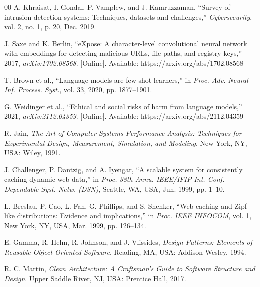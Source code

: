 \documentclass[conference]{IEEEtran}
\begin{document}
\begin{thebibliography}{00}
 A. Khraisat, I. Gondal, P. Vamplew, and J. Kamruzzaman, ``Survey of intrusion detection systems: Techniques, datasets and challenges,'' \textit{Cybersecurity}, vol. 2, no. 1, p. 20, Dec. 2019.

 J. Saxe and K. Berlin, ``eXpose: A character-level convolutional neural network with embeddings for detecting malicious URLs, file paths, and registry keys,'' 2017, \textit{arXiv:1702.08568}. [Online]. Available: https://arxiv.org/abs/1702.08568

 T. Brown et al., ``Language models are few-shot learners,'' in \textit{Proc. Adv. Neural Inf. Process. Syst.}, vol. 33, 2020, pp. 1877--1901.

 G. Weidinger et al., ``Ethical and social risks of harm from language models,'' 2021, \textit{arXiv:2112.04359}. [Online]. Available: https://arxiv.org/abs/2112.04359

 R. Jain, \textit{The Art of Computer Systems Performance Analysis: Techniques for Experimental Design, Measurement, Simulation, and Modeling}. New York, NY, USA: Wiley, 1991.

 J. Challenger, P. Dantzig, and A. Iyengar, ``A scalable system for consistently caching dynamic web data,'' in \textit{Proc. 38th Annu. IEEE/IFIP Int. Conf. Dependable Syst. Netw. (DSN)}, Seattle, WA, USA, Jun. 1999, pp. 1--10.

 L. Breslau, P. Cao, L. Fan, G. Phillips, and S. Shenker, ``Web caching and Zipf-like distributions: Evidence and implications,'' in \textit{Proc. IEEE INFOCOM}, vol. 1, New York, NY, USA, Mar. 1999, pp. 126--134.

 E. Gamma, R. Helm, R. Johnson, and J. Vlissides, \textit{Design Patterns: Elements of Reusable Object-Oriented Software}. Reading, MA, USA: Addison-Wesley, 1994.

 R. C. Martin, \textit{Clean Architecture: A Craftsman's Guide to Software Structure and Design}. Upper Saddle River, NJ, USA: Prentice Hall, 2017.
\end{thebibliography}
\end{document}

